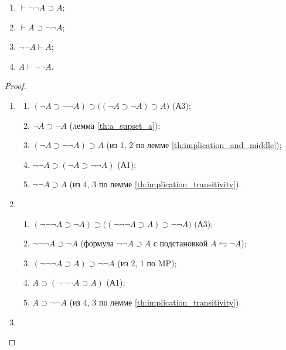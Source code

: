 \begin{lemma}\label{th:negations}\leavevmode
    \begin{enumerate}[label=\arabic*)]
        \item $\vdash \neg\neg A \supset A$;
        \item $\vdash A \supset \neg\neg A$;
        \item $\neg\neg A \vdash A$;
        \item $A \vdash \neg\neg A$.
    \end{enumerate}
\end{lemma}
\begin{proof}\leavevmode
    \begin{enumerate}[label=\arabic*)]
        \item\label{item:negnegA_A}
        \begin{enumerate}[label=\arabic*.]
            \item $(\neg A \supset \neg\neg A) \supset \big((\neg A \supset \neg A) \supset A\big)$ (А3);
            \item $\neg A \supset \neg A$ (лемма \ref{th:a_supset_a});
            \item $(\neg A \supset \neg\neg A) \supset A$ (из 1, 2 по лемме \ref{th:implication_and_middle});
            \item $\neg\neg A \supset (\neg A \supset \neg\neg A)$ (А1);
            \item $\neg\neg A \supset A$ (из 4, 3 по лемме \ref{th:implication_transitivity}).
        \end{enumerate}
        \item
        \begin{enumerate}[label=\arabic*.]
            \item $(\neg\neg\neg A \supset \neg A) \supset \big((\neg\neg\neg A \supset A) \supset \neg\neg A\big)$ (А3);
            \item $\neg\neg\neg A \supset \neg A$ (формула $\neg\neg A \supset A$ с подстановкой $A \leftrightharpoons \neg A$);
            \item $(\neg\neg\neg A \supset A) \supset \neg\neg A$ (из 2, 1 по MP);
            \item $A \supset (\neg\neg\neg A \supset A)$ (А1);
            \item $A \supset \neg\neg A$ (из 4, 3 по лемме \ref{th:implication_transitivity}).
        \end{enumerate}
        \item
        \begin{enumerate}[label=\arabic*.]

\end{enumerate}
\end{enumerate}
\end{proof}
